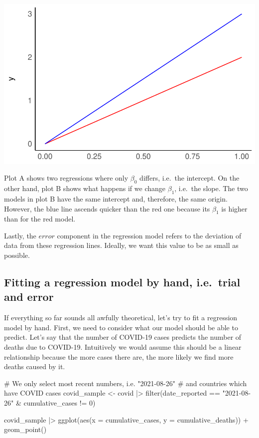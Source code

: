 \documentclass[
  letterpaper,
]{krantz}
\makeatletter
\newenvironment{Shaded}{\begin{snugshade}}{\end{snugshade}}
\newcommand{\AttributeTok}[1]{\textcolor[rgb]{0.40,0.45,0.13}{#1}}
\newcommand{\CommentTok}[1]{\textcolor[rgb]{0.37,0.37,0.37}{#1}}
\newcommand{\DecValTok}[1]{\textcolor[rgb]{0.68,0.00,0.00}{#1}}
\newcommand{\FunctionTok}[1]{\textcolor[rgb]{0.28,0.35,0.67}{#1}}
\newcommand{\NormalTok}[1]{\textcolor[rgb]{0.00,0.23,0.31}{#1}}
\newcommand{\OtherTok}[1]{\textcolor[rgb]{0.00,0.23,0.31}{#1}}
\newcommand{\SpecialCharTok}[1]{\textcolor[rgb]{0.37,0.37,0.37}{#1}}
\newcommand{\StringTok}[1]{\textcolor[rgb]{0.13,0.47,0.30}{#1}}
\newenvironment{kframe}{%
\medskip{}
\setlength{\fboxsep}{.8em}
 \def\at@end@of@kframe{}%
 \ifinner\ifhmode%
  \def\at@end@of@kframe{\end{minipage}}%
  \begin{minipage}{\columnwidth}%
 \fi\fi%
 \def\FrameCommand##1{\hskip\@totalleftmargin \hskip-\fboxsep
 \colorbox{shadecolor}{##1}\hskip-\fboxsep
     \hskip-\linewidth \hskip-\@totalleftmargin \hskip\columnwidth}%
 \MakeFramed {\advance\hsize-\width
   \@totalleftmargin\z@ \linewidth\hsize
   \@setminipage}}%
 {\par\unskip\endMakeFramed%
 \at@end@of@kframe}
\renewenvironment{Shaded}{\begin{kframe}}{\end{kframe}}
\makeatother
\begin{document}
\includegraphics{13_regressions_files/figure-pdf/beta-zer-beta-one-explained-diff-1.pdf}

Plot A shows two regressions where only \(\beta_0\) differs, i.e.~the
intercept. On the other hand, plot B shows what happens if we change
\(\beta_1\), i.e.~the slope. The two models in plot B have the same
intercept and, therefore, the same origin. However, the blue line
ascends quicker than the red one because its \(\beta_1\) is higher than
for the red model.

Lastly, the \(error\) component in the regression model refers to the
deviation of data from these regression lines. Ideally, we want this
value to be as small as possible.

\subsection{Fitting a regression model by hand, i.e.~trial and
error}\label{sec-fitting-a-regression-model-by-hand}

If everything so far sounds all awfully theoretical, let's try to fit a
regression model by hand. First, we need to consider what our model
should be able to predict. Let's say that the number of COVID-19 cases
predicts the number of deaths due to COVID-19. Intuitively we would
assume this should be a linear relationship because the more cases there
are, the more likely we find more deaths caused by it.

\begin{Shaded}
\begin{Highlighting}[]
\CommentTok{\# We only select most recent numbers, i.e. "2021{-}08{-}26"}
\CommentTok{\# and countries which have COVID cases}
\NormalTok{covid\_sample }\OtherTok{\textless{}{-}}
\NormalTok{  covid }\SpecialCharTok{|\textgreater{}}
  \FunctionTok{filter}\NormalTok{(date\_reported }\SpecialCharTok{==} \StringTok{"2021{-}08{-}26"} \SpecialCharTok{\&}
\NormalTok{           cumulative\_cases }\SpecialCharTok{!=} \DecValTok{0}\NormalTok{)}

\NormalTok{covid\_sample }\SpecialCharTok{|\textgreater{}}
  \FunctionTok{ggplot}\NormalTok{(}\FunctionTok{aes}\NormalTok{(}\AttributeTok{x =}\NormalTok{ cumulative\_cases,}
             \AttributeTok{y =}\NormalTok{ cumulative\_deaths)) }\SpecialCharTok{+}
  \FunctionTok{geom\_point}\NormalTok{()}
\end{Highlighting}
\end{Shaded}
\end{document}
